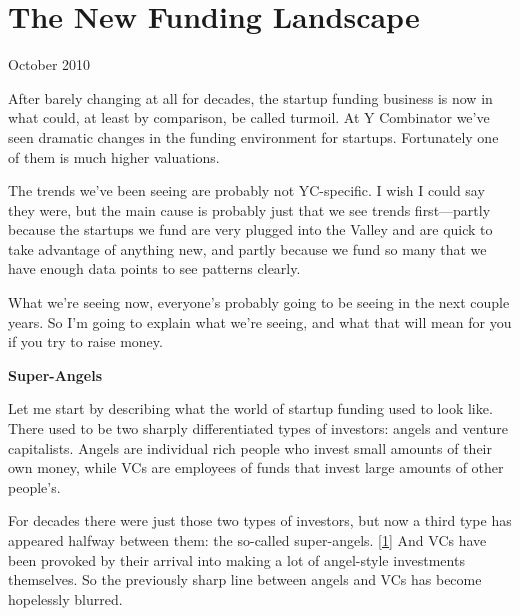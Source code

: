 \chapter{The New Funding Landscape}


            
              
                


                  
                    October 2010

After barely changing at all for
                    decades, the startup funding business is now in what could,
                    at least by comparison, be called turmoil. At Y Combinator
                    we've seen dramatic changes in the funding environment for
                    startups. Fortunately one of them is much higher
                    valuations.

The trends we've been seeing are
                    probably not YC-specific. I wish I could say they were, but
                    the main cause is probably just that we see trends
                    first---partly because the startups we fund are very
                    plugged into the Valley and are quick to take advantage of
                    anything new, and partly because we fund so many that we
                    have enough data points to see patterns clearly.

What
                    we're seeing now, everyone's probably going to be seeing in
                    the next couple years. So I'm going to explain what we're
                    seeing, and what that will mean for you if you try to raise
                    money.

\textbf{Super-Angels}

Let me
                    start by describing what the world of startup funding used
                    to look like. There used to be two sharply differentiated
                    types of investors: angels and venture capitalists. Angels
                    are individual rich people who invest small amounts of their
                    own money, while VCs are employees of funds that invest
                    large amounts of other people's.

For decades
                    there were just those two types of investors, but now a
                    third type has appeared halfway between them: the so-called
                    super-angels.
                    [\href{\#f1n}{1}]
                    And VCs have been provoked by their arrival into making a
                    lot of angel-style investments themselves. So the previously
                    sharp line between angels and VCs has become hopelessly
                    blurred.

